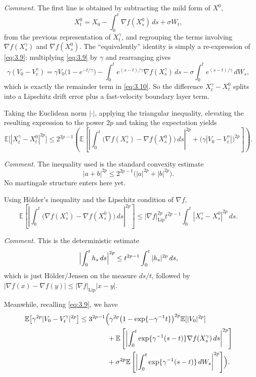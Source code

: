 \documentclass[11pt]{article}
\begin{document}
{\color{teal}
\noindent\emph{Comment.} The first line is obtained by subtracting the mild form of $X^0$,
\[
X_t^0=X_0-\int_0^t \nabla f(X_s^0)\,ds+\sigma W_t,
\]
from the previous representation of $X_t^\gamma$, and regrouping the terms involving $\nabla f(X_s^\gamma)$ and $\nabla f(X_s^0)$. The ``equivalently'' identity is simply a re-expression of \eqref{eq:3.9}: multiplying \eqref{eq:3.9} by $\gamma$ and rearranging gives
\[
\gamma(V_0-V_t^\gamma)
=
\gamma V_0\bigl(1-e^{-t/\gamma}\bigr)
-\int_0^t e^{(s-t)/\gamma}\nabla f(X_s^\gamma)\,ds
-\sigma\int_0^t e^{(s-t)/\gamma}\,dW_s,
\]
which is exactly the remainder term in \eqref{eq:3.10}. So the difference $X_t^\gamma-X_t^0$ splits into a Lipschitz drift error plus a fast-velocity boundary layer term.
}

Taking the Euclidean norm $|\cdot|$, applying the triangular inequality, elevating the resulting expression to the power $2p$ and taking the expectation yields
\begin{equation}
\label{eq:3.11}
\mathbb{E}\bigl[|X_t^{\gamma}-X_t^0|^{2p}\bigr]\le 2^{2p-1}\left(\mathbb{E}\left[\left|\int_0^t \bigl(\nabla f(X_s^{\gamma})-\nabla f(X_s^0)\bigr)\,ds\right|^{2p}+\bigl(\gamma|V_0-V_t^{\gamma}|\bigr)^{2p}\right]\right).
\end{equation}

{\color{teal}
\noindent\emph{Comment.} The inequality used is the standard convexity estimate
\[
|a+b|^{2p}\le 2^{2p-1}\bigl(|a|^{2p}+|b|^{2p}\bigr).
\]
No martingale structure enters here yet.
}

Using H\"older's inequality and the Lipschitz condition of $\nabla f$,
\[
\mathbb{E}\left[\left|\int_0^t \bigl(\nabla f(X_s^{\gamma})-\nabla f(X_s^0)\bigr)\,ds\right|^{2p}\right]\le |\nabla f|_{\mathrm{Lip}}^{2p} t^{2p-1}\int_0^t |X_s^{\gamma}-X_s^0|^{2p}\,ds.
\]

{\color{teal}
\noindent\emph{Comment.} This is the deterministic estimate
\[
\Bigl|\int_0^t h_s\,ds\Bigr|^{2p}\le t^{2p-1}\int_0^t |h_s|^{2p}\,ds,
\]
which is just H\"older/Jensen on the measure $ds/t$, followed by $| \nabla f(x)-\nabla f(y)|\le |\nabla f|_{\mathrm{Lip}}|x-y|$.
}

Meanwhile, recalling \eqref{eq:3.9}, we have
\[
\begin{aligned}
\mathbb{E}\bigl[\gamma^{2p}|V_0-V_t^{\gamma}|^{2p}\bigr]
&\le 3^{2p-1}\Bigl(\gamma^{2p}\bigl(1-\exp\{-\gamma^{-1}t\}\bigr)^{2p}\mathbb{E}[|V_0|^{2p}] \\
&\qquad\qquad +\mathbb{E}\left[\left|\int_0^t \exp\{\gamma^{-1}(s-t)\}\nabla f(X_s^{\gamma})\,ds\right|^{2p}\right] \\
&\qquad\qquad +\sigma^{2p}\mathbb{E}\left[\left|\int_0^t \exp\{\gamma^{-1}(s-t)\}\,dW_s\right|^{2p}\right]\Bigr).
\end{aligned}
\]
\end{document}
